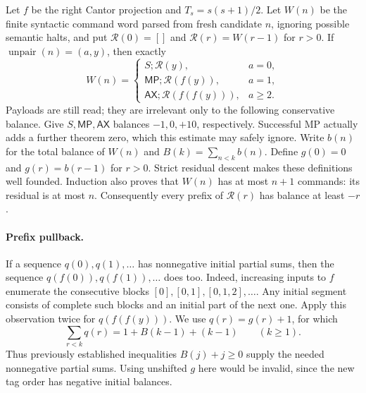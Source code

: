 Let $f$ be the right Cantor projection and $T_s=s(s+1)/2$.  Let $W(n)$
be the finite syntactic command word parsed from fresh candidate $n$,
ignoring possible semantic halts, and put $\mathcal R(0)=[]$ and
$\mathcal R(r)=W(r-1)$ for $r>0$.  If
$\operatorname{unpair}(n)=(a,y)$, then exactly
\[
 W(n)=
 \begin{cases}
  S;\mathcal R(y),&a=0,\\
  \mathsf{MP};\mathcal R(f(y)),&a=1,\\
  \mathsf{AX};\mathcal R(f(f(y))),&a\ge2.
 \end{cases}
 \tag{Schedule}
\]
Payloads are still read; they are irrelevant only to the following
conservative balance.  Give $S,\mathsf{MP},\mathsf{AX}$ balances
$-1,0,+10$, respectively.  Successful MP actually adds a further
theorem zero, which this estimate may safely ignore.  Write $b(n)$
for the total balance of $W(n)$ and
$B(k)=\sum_{n<k}b(n)$.  Define $g(0)=0$ and $g(r)=b(r-1)$ for $r>0$.
Strict residual descent makes these definitions well founded.  Induction
also proves that $W(n)$ has at most $n+1$ commands: its residual is at
most $n$.  Consequently every prefix of $\mathcal R(r)$ has balance
at least $-r$.

\paragraph{Prefix pullback.}
If a sequence $q(0),q(1),\ldots$ has nonnegative initial partial sums,
then the sequence $q(f(0)),q(f(1)),\ldots$ does too.  Indeed, increasing
inputs to $f$ enumerate the consecutive blocks
$[0],[0,1],[0,1,2],\ldots$.  Any initial segment consists of complete
such blocks and an initial part of the next one.  Apply this observation
twice for $q(f(f(y)))$.  We use $q(r)=g(r)+1$, for which
\[
 \sum_{r<k}q(r)=1+B(k-1)+(k-1)\qquad(k\ge1).
 \tag{Shift}
\]
Thus previously established inequalities $B(j)+j\ge0$ supply the
needed nonnegative partial sums.  Using unshifted $g$ here would be
invalid, since the new tag order has negative initial balances.


